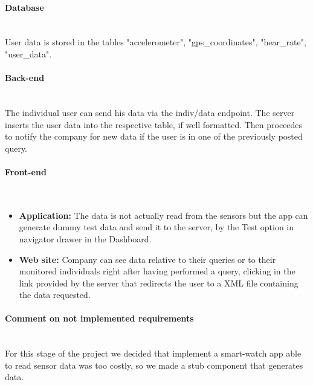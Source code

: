 \paragraph{Database} \mbox{}\\  
User data is stored in the tables "accelerometer", "gps\_coordinates", "hear\_rate", "user\_data".


\paragraph{Back-end} \mbox{}\\  
The individual user can send his data via the {indiv/data} endpoint.
The server inserts the user data into the respective table, if well formatted.
Then proceedes to notify the company for new data if the user is in one of the previously posted query.

\paragraph{Front-end} \mbox{}\\
\begin{itemize}
    \item \textbf{Application:} The data is not actually read from the sensors but the app can generate dummy test data and send it to the server, by the Test option in navigator drawer in the Dashboard.\\
\item \textbf{Web site: }Company can see data relative to their queries or to their monitored individuals right after having performed a query, clicking in the link provided by the server that redirects the user to a XML file containing the data requested.
\end{itemize}

\paragraph{Comment on not implemented requirements} \mbox{}\\ 
For this stage of the project we decided that implement a smart-watch app able to read sensor data was too costly, so we made a stub component that generates data.

